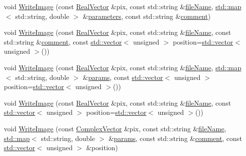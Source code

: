 \begin{DoxyCompactItemize}
void \hyperlink{class_q_s_t_e_m_1_1_c_image_i_o_a8b2842fbfa13791638e27885f6e38646}{Write\-Image} (const \hyperlink{namespace_q_s_t_e_m_a8dfe9e1dbecce3838cb082d96e991ba7}{Real\-Vector} \&pix, const std\-::string \&\hyperlink{qmb_8m_a7a230f02bdffebd1357e3c0b49e01271}{file\-Name}, \hyperlink{_displacement_params_8m_af619c74fd72bdb64d115463dff2720cd}{std\-::map}$<$ std\-::string, double $>$ \&\hyperlink{sim_image_from_wave_8m_acb6d7970e73c00effe1d16e23142f11d}{parameters}, const std\-::string \&\hyperlink{image_sim_8m_aea4cc4bd8e43a7f8ebf9b0ee3da8d681}{comment})
\item 
void \hyperlink{class_q_s_t_e_m_1_1_c_image_i_o_a64f12e2de142a5454a9d539bd1a44ba8}{Write\-Image} (const \hyperlink{namespace_q_s_t_e_m_a8dfe9e1dbecce3838cb082d96e991ba7}{Real\-Vector} \&pix, const std\-::string \&\hyperlink{qmb_8m_a7a230f02bdffebd1357e3c0b49e01271}{file\-Name}, const std\-::string \&\hyperlink{image_sim_8m_aea4cc4bd8e43a7f8ebf9b0ee3da8d681}{comment}, const \hyperlink{qmb_8m_af54b69a32590de218622e869b06b47b3}{std\-::vector}$<$ unsigned $>$ position=\hyperlink{qmb_8m_af54b69a32590de218622e869b06b47b3}{std\-::vector}$<$ unsigned $>$())
\item 
void \hyperlink{class_q_s_t_e_m_1_1_c_image_i_o_a6c5d322842e87cd6aff0bb1996682501}{Write\-Image} (const \hyperlink{namespace_q_s_t_e_m_a8dfe9e1dbecce3838cb082d96e991ba7}{Real\-Vector} \&pix, const std\-::string \&\hyperlink{qmb_8m_a7a230f02bdffebd1357e3c0b49e01271}{file\-Name}, \hyperlink{_displacement_params_8m_af619c74fd72bdb64d115463dff2720cd}{std\-::map}$<$ std\-::string, double $>$ \&\hyperlink{image_sim_8m_ad57b218fb254a1624c09ad71cb6b6415}{params}, const \hyperlink{qmb_8m_af54b69a32590de218622e869b06b47b3}{std\-::vector}$<$ unsigned $>$ position=\hyperlink{qmb_8m_af54b69a32590de218622e869b06b47b3}{std\-::vector}$<$ unsigned $>$())
\item 
void \hyperlink{class_q_s_t_e_m_1_1_c_image_i_o_a830d7edaa670a4414f72b3cfa2e7c32e}{Write\-Image} (const \hyperlink{namespace_q_s_t_e_m_a8dfe9e1dbecce3838cb082d96e991ba7}{Real\-Vector} \&pix, const std\-::string \&\hyperlink{qmb_8m_a7a230f02bdffebd1357e3c0b49e01271}{file\-Name}, const \hyperlink{qmb_8m_af54b69a32590de218622e869b06b47b3}{std\-::vector}$<$ unsigned $>$ position=\hyperlink{qmb_8m_af54b69a32590de218622e869b06b47b3}{std\-::vector}$<$ unsigned $>$())
\item 
void \hyperlink{class_q_s_t_e_m_1_1_c_image_i_o_aeb80c2e87f514f3715661ce4c8bf84db}{Write\-Image} (const \hyperlink{namespace_q_s_t_e_m_af210a2c1f9afae1deed746dcd9276221}{Complex\-Vector} \&pix, const std\-::string \&\hyperlink{qmb_8m_a7a230f02bdffebd1357e3c0b49e01271}{file\-Name}, \hyperlink{_displacement_params_8m_af619c74fd72bdb64d115463dff2720cd}{std\-::map}$<$ std\-::string, double $>$ \&\hyperlink{image_sim_8m_ad57b218fb254a1624c09ad71cb6b6415}{params}, const std\-::string \&\hyperlink{image_sim_8m_aea4cc4bd8e43a7f8ebf9b0ee3da8d681}{comment}, const \hyperlink{qmb_8m_af54b69a32590de218622e869b06b47b3}{std\-::vector}$<$ unsigned $>$ \&position)

\end{DoxyCompactItemize}
